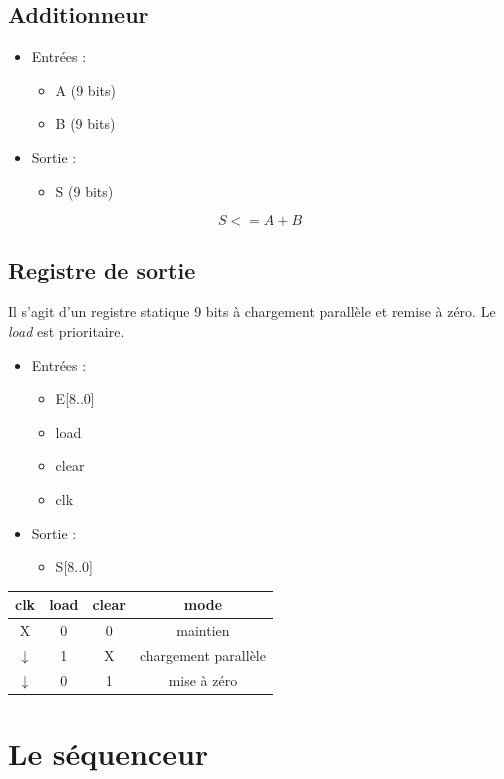 \documentclass[a4paper]{report}
\begin{document}
\subsection{Additionneur}
\begin{itemize}
	\item Entrées :
	\begin{itemize}
		\item A (9 bits)
		\item B (9 bits)
	\end{itemize}
	\item Sortie :
	\begin{itemize}
		\item S (9 bits)
	\end{itemize}
\end{itemize}
\[
S <= A+B
\]

\subsection{Registre de sortie}
Il s'agit d'un registre statique 9 bits à chargement parallèle et remise à zéro.
Le \emph{load} est prioritaire.
\begin{itemize}
	\item Entrées :
	\begin{itemize}
		\item E[8..0]
		\item load
		\item clear
		\item clk
	\end{itemize}
	\item Sortie :
	\begin{itemize}
		\item S[8..0]
	\end{itemize}
\end{itemize}

\begin{center}
	\begin{tabular}{|c|c|c|c|}
		\hline
		clk & load & clear & mode \\
		\hline
		X & 0 & 0 & maintien \\
		\hline
		$\downarrow$ & 1 & X & chargement parallèle \\
		\hline
		$\downarrow$ & 0 & 1 & mise à zéro \\
		\hline
	\end{tabular}
\end{center}

\section{Le séquenceur}
\end{document}
